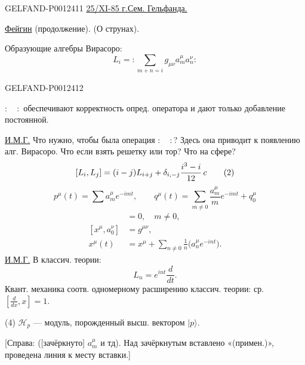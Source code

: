 \begin{GelfandAdjacentEvidence}{GELFAND-P001241}{1}
\underline{25/XI-85 г.}\qquad \underline{Сем. Гельфанда.}

\underline{Фейгин} (продолжение). (О струнах).

Образующие алгебры Вирасоро:
\begin{equation*}
L_i=:\sum_{m+n=i}g_{\mu\nu}a_m^\mu a_n^\nu:\tag{1}
\end{equation*}
\end{GelfandAdjacentEvidence}
\begin{GelfandAdjacentEvidence}{GELFAND-P001241}{2}


$:\quad:$ обеспечивают корректность опред. оператора и дают только добавление постоянной.

\underline{И.М.Г.} Что нужно, чтобы была операция $:\quad:$? Здесь она приводит к появлению алг. Вирасоро. Что если взять решетку или тор? Что на сфере?
\begin{equation*}
\relax [L_i,L_j]=(i-j)L_{i+j}+\delta_{i,-j}\frac{i^3-i}{12}\,c\tag{2}
\end{equation*}
\begin{equation*}
p^\mu(t)=\sum a_m^\mu e^{-imt},\qquad
q^\mu(t)=\sum_{m\ne0}\frac{a_m^\mu}{m}e^{-imt}+q_0^\mu\tag{3}
\end{equation*}
\begin{align*}
[x^\mu,a_m^\nu]&=0,\quad m\ne0,\\[0pt]
[x^\mu,a_0^\nu]&=g^{\mu\nu},\\
x^\mu(t)&=x^\mu+\sum_{n\ne0}\frac1n\bigl(a_n^\mu e^{-int}\bigr).
\end{align*}
\underline{И.М.Г.} В классич. теории:
\begin{equation*}
L_n=e^{int}\frac{d}{dt}.
\end{equation*}
Квант. механика соотв. одномерному расширению классич. теории: ср. $[\frac{d}{dx},x]=1$.

(4) $\mathcal H_p$ — модуль, порожденный высш. вектором $|p\rangle$.

[Справа: ([зачёркнуто] $a_m^\mu$ и тд). Над зачёркнутым вставлено «(примен.)», проведена линия к месту вставки.]
\end{GelfandAdjacentEvidence}
